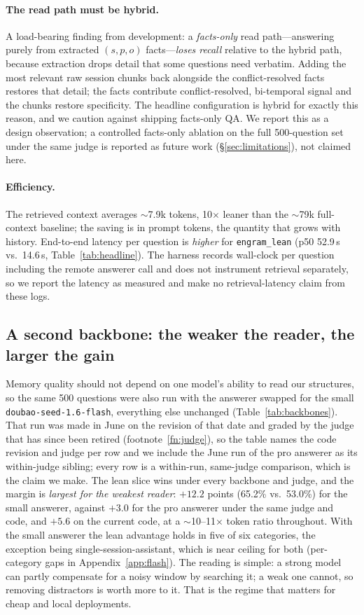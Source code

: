 \documentclass{article}
\newcommand{\lean}{\texttt{engram\_lean}}
\begin{document}
\paragraph{The read path must be hybrid.}
A load-bearing finding from development: a \emph{facts-only} read path---answering purely from extracted
$(s,p,o)$ facts---\emph{loses recall} relative to the hybrid path, because extraction drops detail that some
questions need verbatim. Adding the most relevant raw session chunks back alongside the conflict-resolved
facts restores that detail; the facts contribute conflict-resolved, bi-temporal signal and the chunks restore
specificity. The headline configuration is hybrid for exactly this reason, and we caution against shipping
facts-only QA. We report this as a design observation; a controlled facts-only ablation on the full
500-question set under the same judge is reported as future work (\S\ref{sec:limitations}), not claimed here.

\paragraph{Efficiency.}
The retrieved context averages $\sim$7.9k tokens, 10$\times$ leaner than the $\sim$79k full-context
baseline; the saving is in prompt tokens, the quantity that grows with history. End-to-end latency per
question is \emph{higher} for \lean{} (p50 52.9\,s vs.\ 14.6\,s, Table~\ref{tab:headline}). The harness
records wall-clock per question including the remote answerer call and does not instrument retrieval
separately, so we report the latency as measured and make no retrieval-latency claim from these logs.

\subsection{A second backbone: the weaker the reader, the larger the gain}
\label{sec:backbones}

Memory quality should not depend on one model's ability to read our structures, so the same 500 questions
were also run with the answerer swapped for the small \texttt{doubao-seed-1.6-flash}, everything else
unchanged (Table~\ref{tab:backbones}). That run was made in June on the revision of that date and graded by
the judge that has since been retired (footnote~\ref{fn:judge}), so the table names the code revision and
judge per row and we include the June run of the pro answerer as its within-judge sibling; every row is a
within-run, same-judge comparison, which is the claim we make. The lean slice wins under every backbone and
judge, and the margin is \emph{largest for the weakest reader}: $+12.2$ points (65.2\% vs.\ 53.0\%) for the
small answerer, against $+3.0$ for the pro answerer under the same judge and code, and $+5.6$ on the current
code, at a $\sim$10--11$\times$ token ratio throughout. With the small answerer the lean advantage holds in
five of six categories, the exception being single-session-assistant, which is near ceiling for both
(per-category gaps in Appendix~\ref{app:flash}). The reading is simple: a strong model can partly compensate for a
noisy window by searching it; a weak one cannot, so removing distractors is worth more to it. That is the
regime that matters for cheap and local deployments.
\end{document}
